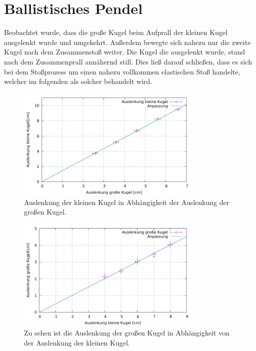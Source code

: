 \section{Ballistisches Pendel}\label{kap:Bal}
Beobachtet wurde, dass die große Kugel beim Aufprall der kleinen Kugel ausgelenkt wurde und umgekehrt. Außerdem bewegte sich nahezu nur die zweite Kugel nach dem Zusammenstoß weiter. Die Kugel die ausgelenkt wurde, stand nach dem Zusammenprall annähernd still. Dies ließ darauf schließen, dass es sich bei dem Stoßprozess um einen nahezu vollkommen elastischen Stoß handelte, welcher im folgenden als solcher behandelt wird.

\begin{figure}[h]
	\centering
	\includegraphics[width=0.8\textwidth]{res/GrosKlein.pdf}
	\caption{Auslenkung der kleinen Kugel in Abhängigkeit der Auslenkung der großen Kugel.}
	\label{fig:grosklein}
\end{figure}
\begin{figure}[h]
	\centering
	\includegraphics[width=0.8\textwidth]{res/KleinGros.pdf}
	\caption{Zu sehen ist die Auslenkung der großen Kugel in Abhängigkeit von der Auslenkung der kleinen Kugel.}
	\label{fig:kleingros}
\end{figure}

